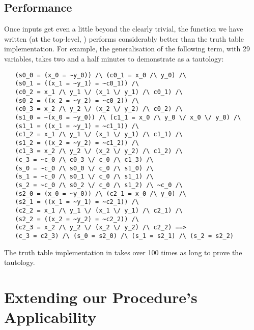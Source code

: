 \subsection{Performance}
\label{sec:dpll-performance}

Once inputs get even a little beyond the clearly trivial, the function
we have written (at the top-level, ) performs considerably
better than the truth table implementation.  For example, the
generalisation of the following term, with 29 variables, takes
 two and a half minutes to demonstrate as a tautology:
\begin{hol}
\begin{verbatim}
   (s0_0 = (x_0 = ~y_0)) /\ (c0_1 = x_0 /\ y_0) /\
   (s0_1 = ((x_1 = ~y_1) = ~c0_1)) /\
   (c0_2 = x_1 /\ y_1 \/ (x_1 \/ y_1) /\ c0_1) /\
   (s0_2 = ((x_2 = ~y_2) = ~c0_2)) /\
   (c0_3 = x_2 /\ y_2 \/ (x_2 \/ y_2) /\ c0_2) /\
   (s1_0 = ~(x_0 = ~y_0)) /\ (c1_1 = x_0 /\ y_0 \/ x_0 \/ y_0) /\
   (s1_1 = ((x_1 = ~y_1) = ~c1_1)) /\
   (c1_2 = x_1 /\ y_1 \/ (x_1 \/ y_1) /\ c1_1) /\
   (s1_2 = ((x_2 = ~y_2) = ~c1_2)) /\
   (c1_3 = x_2 /\ y_2 \/ (x_2 \/ y_2) /\ c1_2) /\
   (c_3 = ~c_0 /\ c0_3 \/ c_0 /\ c1_3) /\
   (s_0 = ~c_0 /\ s0_0 \/ c_0 /\ s1_0) /\
   (s_1 = ~c_0 /\ s0_1 \/ c_0 /\ s1_1) /\
   (s_2 = ~c_0 /\ s0_2 \/ c_0 /\ s1_2) /\ ~c_0 /\
   (s2_0 = (x_0 = ~y_0)) /\ (c2_1 = x_0 /\ y_0) /\
   (s2_1 = ((x_1 = ~y_1) = ~c2_1)) /\
   (c2_2 = x_1 /\ y_1 \/ (x_1 \/ y_1) /\ c2_1) /\
   (s2_2 = ((x_2 = ~y_2) = ~c2_2)) /\
   (c2_3 = x_2 /\ y_2 \/ (x_2 \/ y_2) /\ c2_2) ==>
   (c_3 = c2_3) /\ (s_0 = s2_0) /\ (s_1 = s2_1) /\ (s_2 = s2_2)
\end{verbatim}
\end{hol}
The truth table implementation in \ml{tautLib} takes over 100 times as long
to prove the tautology.

\section{Extending our Procedure's Applicability}
\label{sec:dpll-applicability-extension}




